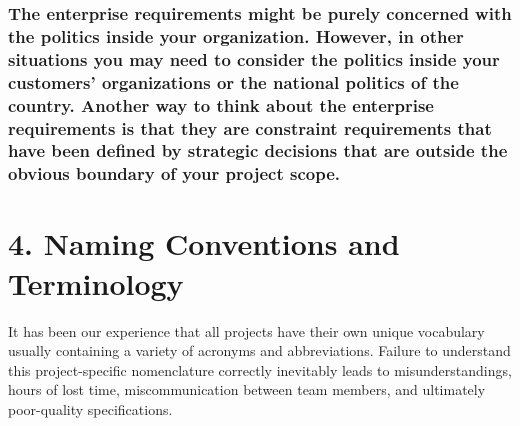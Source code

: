 \documentclass[
]{article}
\begin{document}
\hypertarget{the-enterprise-requirements-might-be-purely-concerned-with-the-politics-inside-your-organization.-however-in-other-situations-you-may-need-to-consider-the-politics-inside-your-customers-organizations-or-the-national-politics-of-the-country.-another-way-to-think-about-the-enterprise-requirements-is-that-they-are-constraint-requirements-that-have-been-defined-by-strategic-decisions-that-are-outside-the-obvious-boundary-of-your-project-scope.}{%
\subsubsection{\texorpdfstring{The enterprise requirements might be
purely concerned with the politics inside your organization. However, in
other situations you may need to consider the politics inside your
customers' organizations or the national politics of the country.
Another way to think about the enterprise requirements is that they are
constraint requirements that have been defined by strategic decisions
that are outside the obvious boundary of your project scope.
}{The enterprise requirements might be purely concerned with the politics inside your organization. However, in other situations you may need to consider the politics inside your customers' organizations or the national politics of the country. Another way to think about the enterprise requirements is that they are constraint requirements that have been defined by strategic decisions that are outside the obvious boundary of your project scope. }}\label{the-enterprise-requirements-might-be-purely-concerned-with-the-politics-inside-your-organization.-however-in-other-situations-you-may-need-to-consider-the-politics-inside-your-customers-organizations-or-the-national-politics-of-the-country.-another-way-to-think-about-the-enterprise-requirements-is-that-they-are-constraint-requirements-that-have-been-defined-by-strategic-decisions-that-are-outside-the-obvious-boundary-of-your-project-scope.}}

\hypertarget{naming-conventions-and-terminology}{%
\section{\texorpdfstring{4. Naming Conventions and Terminology
}{4. Naming Conventions and Terminology }}\label{naming-conventions-and-terminology}}

It has been our experience that all projects have their own unique
vocabulary usually containing a variety of acronyms and abbreviations.
Failure to understand this project-specific nomenclature correctly
inevitably leads to misunderstandings, hours of lost time,
miscommunication between team members, and ultimately poor-quality
specifications.
\end{document}
